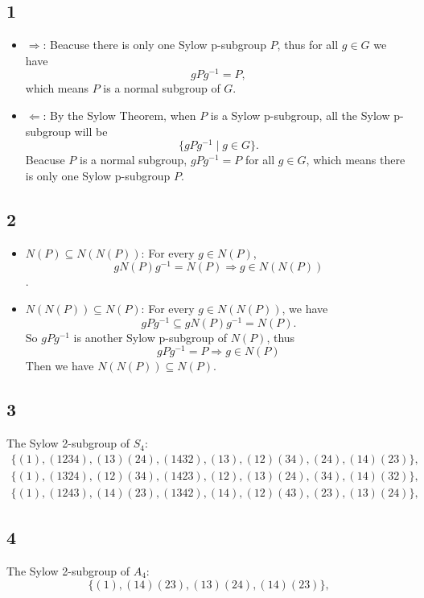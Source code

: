 \documentclass[draft]{article}
\begin{document}
		\subsection*{1}
			\begin{itemize}
				\item $\Rightarrow$:
					Beacuse there is only one Sylow p-subgroup $P$, thus for all $g \in G$ we
					have
					$$
						gPg^{-1} = P,
					$$
					which means $P$ is a normal subgroup of $G$.
				\item $\Leftarrow$:
					By the Sylow Theorem, when $P$ is a Sylow p-subgroup, all the Sylow
					p-subgroup will be
					$$
						\{ gPg^{-1} \mid g \in G\}.
					$$
					Beacuse $P$ is a normal subgroup, $gPg^{-1} = P$ for all $g \in G$,
					which means there is only one Sylow p-subgroup $P$.
			\end{itemize}
		\subsection*{2}
			\begin{itemize}
				\item $N(P) \subseteq N(N(P))$:
					For every $g \in N(P)$, 
					$$
						gN(P)g^{-1} = N(P) \Rightarrow g \in N(N(P))
					$$.
				\item $N(N(P)) \subseteq N(P)$:
					For every $g \in N(N(P))$, we have
					$$
						gPg^{-1} \subseteq gN(P)g^{-1} = N(P).
					$$
					So $gPg^{-1}$ is another Sylow p-subgroup of $N(P)$, thus 
					$$
						gPg^{-1} = P \Rightarrow g \in N(P)
					$$
					Then we have $N(N(P)) \subseteq N(P)$.
			\end{itemize}
		\subsection*{3}
			The Sylow 2-subgroup of $S_4$:
			\begin{equation*}
				\begin{split}
					\{(1),(1234),(13)(24),(1432),(13),(12)(34),(24),(14)(23)\}, \\
					\{(1),(1324),(12)(34),(1423),(12),(13)(24),(34),(14)(32)\}, \\
					\{(1),(1243),(14)(23),(1342),(14),(12)(43),(23),(13)(24)\},
				\end{split}
			\end{equation*}
		\subsection*{4}
			The Sylow 2-subgroup of $A_4$:
			$$
				\{(1),(14)(23),(13)(24),(14)(23)\},
			$$
\end{document}

